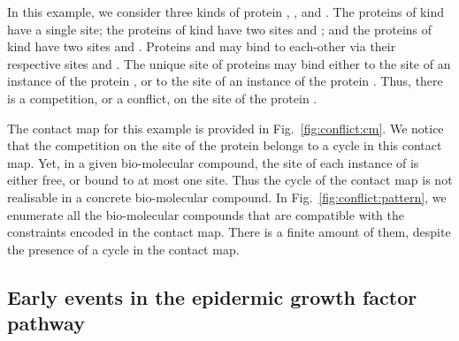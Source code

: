 \documentclass{entcs}
\begin{document}
In this example, we consider three kinds of protein , , and . The proteins of kind  have a single site; the proteins of kind  have two sites  and ; and the proteins of kind  have two sites  and . Proteins  and  may bind to each-other via their respective sites  and .
The unique site of proteins  may bind either to the site  of an instance of the protein , or to the site  of an instance of the protein . Thus, there is a competition, or a conflict, on the site of the protein .

The contact map for this example is provided in Fig.~\ref{fig:conflict:cm}.
We notice that the competition on the site of the protein  belongs to a cycle in this contact map. Yet, in a given bio-molecular compound,
the site of each instance of  is either free, or bound to at most one site. Thus the cycle of the contact map is not realisable
in a concrete bio-molecular compound. In Fig.~\ref{fig:conflict:pattern}, we enumerate all the bio-molecular compounds that are compatible with the constraints encoded in the contact map. There is a finite amount of them, despite the presence of a cycle in the contact map.


\subsection{Early events in the epidermic growth factor pathway}

\label{sec:egfr}
\end{document}
